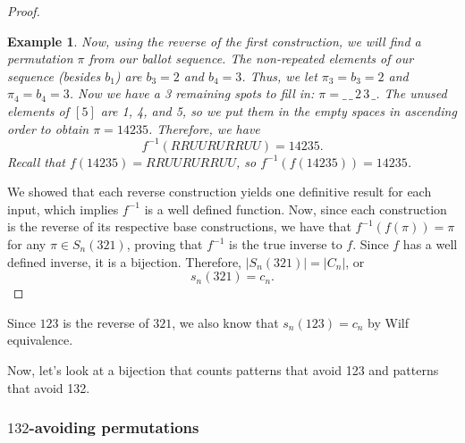 \documentclass[12pt]{article}
\newtheorem{ex}{Example} %
\begin{document}
\begin{proof}
\begin{ex}
        Now, using the reverse of the first construction, we will find a permutation $\pi$ from our ballot sequence. The non-repeated elements of our sequence (besides $b_1$) are $b_3=2$ and $b_4=3$. Thus, we let $\pi_3=b_3=2$ and $\pi_4=b_4=3$. Now we have a 3 remaining spots to fill in: $\pi=\_\,\_\,2\,3\,\_$. The unused elements of $[5]$ are 1, 4, and 5, so we put them in the empty spaces in ascending order to obtain $\pi=14235$. Therefore, we have $$f^{-1}(RRUURURRUU)=14235.$$
        Recall that $f(14235)=RRUURURRUU$, so $f^{-1}(f(14235))=14235$.
    \end{ex}

    
    We showed that each reverse construction yields one definitive result for each input, which implies $f^{-1}$ is a well defined function. Now, since each construction is the reverse of its respective base constructions, we have that $f^{-1}(f(\pi))=\pi$ for any $\pi\in S_n(321)$, proving that $f^{-1}$ is the true inverse to $f$.
    Since $f$ has a well defined inverse, it is a bijection. Therefore, $|S_n(321)|=|C_n|$, or $$s_n(321)=c_n.$$
    
    
    

\end{proof}

Since $123$ is the reverse of $321$, we also know that $s_n(123)=c_n$ by Wilf equivalence.

Now, let's look at a bijection that counts patterns that avoid 123 and patterns that avoid 132.

\subsubsection{$132$-avoiding permutations}
\end{document}
